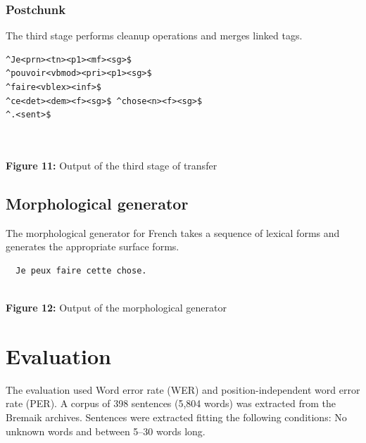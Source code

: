 \documentclass[a0,landscape]{a0poster}
\begin{document}
\begin{multicols}{4}
\subsubsection{Postchunk}

\noindent
The third stage performs cleanup operations and merges linked 
tags.\\

\begin{center}
\begin{minipage}[b]{25cm}
\begin{small}
\begin{verbatim}
^Je<prn><tn><p1><mf><sg>$ 
^pouvoir<vbmod><pri><p1><sg>$ 
^faire<vblex><inf>$ 
^ce<det><dem><f><sg>$ ^chose<n><f><sg>$
^.<sent>$
\end{verbatim}
\end{small}
\end{minipage}\\
~\\
\textbf{Figure 11:} Output of the third stage of transfer 
\end{center}

\subsection{Morphological generator}

\noindent
The morphological generator for French takes a sequence of lexical forms and generates the appropriate surface forms. 
\vspace{0.3cm}
\begin{center}
\begin{minipage}[b]{26cm}
\begin{small}
\begin{verbatim}
  Je peux faire cette chose.
\end{verbatim}
\end{small}
\end{minipage}\\
\vspace{0.3cm}
\textbf{Figure 12:} Output of the morphological generator
\end{center}

\section{Evaluation} 

\noindent
The evaluation used Word error rate (WER) and position-independent word error rate (PER).
A corpus of 398 sentences (5,804 words) was extracted from the Bremaik archives. Sentences were extracted
fitting the following conditions: No unknown words and between 5--30 words long. \\


\end{multicols}
\end{document}

